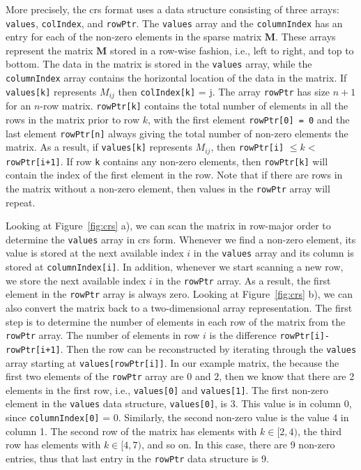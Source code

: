 More precisely, the \gls{crs} format uses a data structure consisting of three arrays: \lstinline{values}, \lstinline{colIndex}, and \lstinline{rowPtr}. The \lstinline{values} array and the \lstinline{columnIndex} has an entry for each of the non-zero elements in the sparse matrix $\mathbf{M}$. These arrays represent the matrix $\mathbf{M}$ stored in a row-wise fashion, i.e., left to right, and top to bottom. The data in the matrix is stored in the \lstinline|values| array, while the \lstinline{columnIndex} array contains the horizontal location of the data in the matrix.  If \lstinline|values[k]| represents $M_{ij}$ then \lstinline|colIndex[k]| = j. The array \lstinline{rowPtr} has size $n+1$ for an $n$-row matrix.  \lstinline|rowPtr[k]| contains the total number of elements in all the rows in the matrix prior to row $k$, with the first element \lstinline|rowPtr[0] = 0| and the last element \lstinline|rowPtr[n]| always giving the total number of non-zero elements the matrix.  As a result, if \lstinline|values[k]| represents $M_{ij}$, then \lstinline|rowPtr[i]| $\leq k < $\lstinline|rowPtr[i+1]|.  If row \lstinline|k| contains any non-zero elements, then \lstinline|rowPtr[k]| will contain the index of the first element in the row.  Note that if there are rows in the matrix without a non-zero element, then values in the \lstinline|rowPtr| array will repeat.

Looking at Figure~\ref{fig:crs} a), we can scan the matrix in row-major order to determine the \lstinline{values} array in \gls{crs} form.  Whenever we find a non-zero element, its value is stored at the next available index $i$ in the \lstinline|values| array and its column is stored at \lstinline{columnIndex[i]}.  In addition, whenever we start scanning a new row, we store the next available index $i$ in the \lstinline|rowPtr| array.  As a result, the first element in the \lstinline|rowPtr| array is always zero. 
Looking at Figure~\ref{fig:crs} b), we can also convert the matrix back to a two-dimensional array representation.  The first step is to determine the number of elements in each row of the matrix from the \lstinline|rowPtr| array.  The number of elements in row $i$ is the difference \lstinline|rowPtr[i]-rowPtr[i+1]|.   Then the row can be reconstructed by iterating through the \lstinline|values| array starting at \lstinline|values[rowPtr[i]]|. In our example matrix, the because the first two elements of the \lstinline|rowPtr| array are $0$ and $2$, then we know that there are 2 elements in the first row, i.e., \lstinline|values[0]| and \lstinline|values[1]|.  The first non-zero element in the \lstinline{values} data structure, \lstinline|values[0]|, is $3$.  This value is in column 0, since \lstinline{columnIndex[0]} = 0. Similarly, the second non-zero value is the value 4 in column 1. The second row of the matrix has elements with $k \in [2,4)$,  the third row has elements with $k \in [4,7)$, and so on.  In this case, there are 9 non-zero entries, thus that last entry in the \lstinline{rowPtr} data structure is 9. 
 
